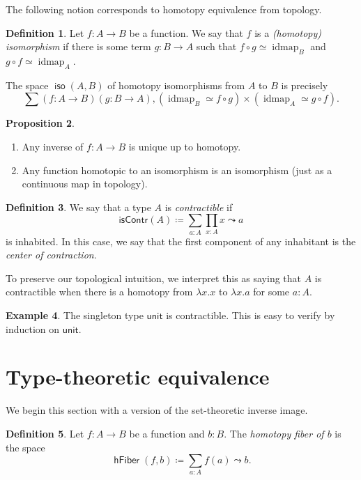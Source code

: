 \documentclass[10pt,letterpaper,cm]{nupset}
\theoremstyle{definition}
\newtheorem{definition}{Definition}[subsection]
\newtheorem{exmp}[definition]{Example}
\theoremstyle{theorem}
\newtheorem{prop}[definition]{Proposition}
\theoremstyle{remark}
\newcommand{\1}{\mathbf{1}}
\newcommand{\0}{\vec 0}
\DeclareMathOperator{\idmap}{idmap}
\DeclareMathOperator{\iso}{\mathsf{iso}}
\DeclareMathOperator{\hfiber}{\mathsf{hFiber}}
\begin{document}
\bigskip

The following notion corresponds to homotopy equivalence from topology.

\begin{definition}
Let $f: A \to B$ be a function. We say that $f$ is a \textit{(homotopy) isomorphism} if there is some term $g:  B \to A$ such that $f \circ g \simeq \idmap_B$ and $g\circ f \simeq \idmap_A$.
\end{definition}


The space $\iso(A,B)$ of homotopy isomorphisms from $A$ to $B$ is precisely $$\sum\left(f:A\to B\right)\left(g:B \to A\right), \left(\idmap_B \simeq f\circ g\right) \times  \left(\idmap_A \simeq g\circ f\right).$$


\begin{prop} $ $
\begin{enumerate}
\item Any inverse of $f: A \to B$ is unique up to homotopy. 
\item  Any function homotopic to an isomorphism is an isomorphism (just as a continuous map in topology).
\end{enumerate}
\end{prop}

\begin{definition}
We say that a type $A$ is \textit{contractible} if 
\[
\mathsf{isContr}(A)\coloneqq \sum_{a:A}\prod_{x:A}x \leadsto a
\] is inhabited. In this case, we say that the first component of any inhabitant is the \textit{center of contraction}.
\end{definition}


To preserve our topological intuition, we interpret this as saying that $A$ is contractible when there is a homotopy from $\lambda x.x$ to $\lambda x.a$ for some $a:A$.


\begin{exmp}
The singleton type  $\mathsf{unit}$ is contractible. This is easy to verify by induction on $\mathsf{unit}$.
\end{exmp}

\section{Type-theoretic equivalence}

We begin this section with a version of the set-theoretic inverse image.

\begin{definition}
Let $f: A \to B$ be a function and $b: B$. The \textit{homotopy fiber of $b$} is the space $$\hfiber(f,b) \coloneqq \sum_{a:A}f(a) \leadsto b .$$
\end{definition}
\end{document}

